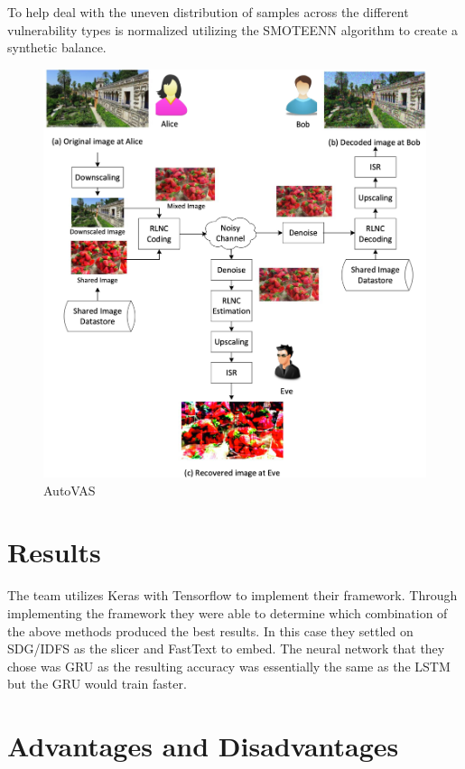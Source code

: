 \documentclass[]{article}
\begin{document}
To help deal with the uneven distribution of samples across the different vulnerability types is normalized utilizing the 
SMOTEENN \cite{Li2013}
algorithm to create a synthetic balance.

\begin{figure}[h]
	\centering
	\includegraphics[width=\textwidth]{Algorithm}
	\caption{AutoVAS \cite{Jeon2021}}
\end{figure}


\section{Results}

The team utilizes Keras with Tensorflow to implement their framework.
Through implementing the framework they were able to determine which combination of the above methods produced the best results.
In this case they settled on SDG/IDFS as the slicer and FastText to embed.
The neural network that they chose was GRU as the resulting accuracy was essentially the same as the LSTM but the GRU would train faster.

\section{Advantages and Disadvantages}
\end{document}
